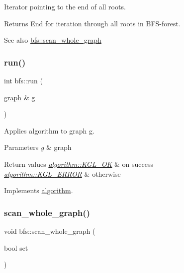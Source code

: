 Iterator pointing to the end of all roots. 

\begin{DoxyReturn}{Returns}
End for iteration through all roots in B\+F\+S-\/forest. 
\end{DoxyReturn}
\begin{DoxySeeAlso}{See also}
\mbox{\hyperlink{classbfs_a25fc51b1bfbbdd3afefe0a84c1bd2f6b}{bfs\+::scan\+\_\+whole\+\_\+graph}} 
\end{DoxySeeAlso}
\mbox{\label{classbfs_a06ae16bd0f3bb2f8eb6b3e36659ba82e}} 
\subsubsection{\texorpdfstring{run()}{run()}}
{\footnotesize\ttfamily int bfs\+::run (\begin{DoxyParamCaption}\item[{\mbox{\hyperlink{classgraph}{graph}} \&}]{g }\end{DoxyParamCaption})\hspace{0.3cm}{\ttfamily [virtual]}}



Applies algorithm to graph g. 


\begin{DoxyParams}{Parameters}
{\em g} & graph \\
\hline
\end{DoxyParams}

\begin{DoxyRetVals}{Return values}
{\em \mbox{\hyperlink{classalgorithm_af1a0078e153aa99c24f9bdf0d97f6710aae4c1cd7fe8d8cf4b143241a6e7c31cf}{algorithm\+::\+K\+G\+L\+\_\+\+OK}}} & on success \\
\hline
{\em \mbox{\hyperlink{classalgorithm_af1a0078e153aa99c24f9bdf0d97f6710ae67bf27b2ef31f73e545a7f9f4a69556}{algorithm\+::\+K\+G\+L\+\_\+\+E\+R\+R\+OR}}} & otherwise \\
\hline
\end{DoxyRetVals}


Implements \mbox{\hyperlink{classalgorithm_a734b189509a8d6b56b65f8ff772d43ca}{algorithm}}.

\mbox{\label{classbfs_a25fc51b1bfbbdd3afefe0a84c1bd2f6b}} 
\subsubsection{\texorpdfstring{scan\+\_\+whole\+\_\+graph()}{scan\_whole\_graph()}\hspace{0.1cm}{\footnotesize\ttfamily [1/2]}}
{\footnotesize\ttfamily void bfs\+::scan\+\_\+whole\+\_\+graph (\begin{DoxyParamCaption}\item[{bool}]{set }\end{DoxyParamCaption})\hspace{0.3cm}{\ttfamily [inline]}}



